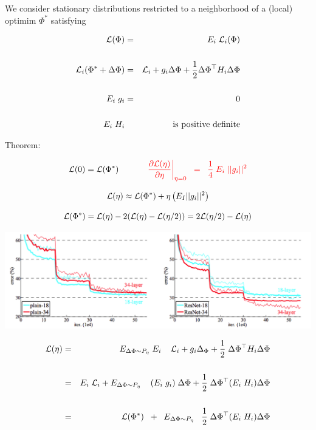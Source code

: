 {\vfill
We consider stationary distributions restricted to a neighborhood of a (local) optimim $\Phi^*$ satisfying

\begin{eqnarray*}
{\cal L}(\Phi) & = & E_i\;{\cal L}_i(\Phi) \\
\\
{\cal L}_i(\Phi^* + \Delta \Phi) & = & {\cal L}_i + g_i \Delta \Phi + \frac{1}{2} \Delta\Phi^\top H_i \Delta\Phi \\
\\
E_i\; g_i & = & 0\\
\\
E_i\; H_i & & \mbox{is positive definite}
\end{eqnarray*}


Theorem:

$${\cal L}(0) = {\cal L}(\Phi^*)\;\;\;\;\;\;\;\;\;\;\;\;{\color{red} \left.\frac{\partial {\cal L}(\eta)}{\partial \eta}\right|_{\eta = 0} \;\;=\;\; \frac{1}{4}\; E_i\; ||g_i||^2}$$


$${\cal L}(\eta) \approx {\cal L}(\Phi^*) + \eta \left(E_I ||g_i||^2\right)$$

\vfill
$${\cal L}(\Phi^*) = {\cal L}(\eta) - 2({\cal L}(\eta) - {\cal L}(\eta/2)) = 2{\cal L}(\eta/2) - {\cal L}(\eta)$$

\vfill
\centerline{\includegraphics[width = 7in]{../images/annealing}}


\begin{eqnarray*}
{\cal L}(\eta) & = & \;\;\; E_{\Delta \Phi \sim P_\eta}\;E_i \;\;\;\; {\cal L}_i + g_i\Delta _\Phi + \frac{1}{2}\;\Delta \Phi^\top H_i \Delta \Phi \\
\\
& = & E_i\; {\cal L}_i + E_{\Delta \Phi \sim P_\eta} \;\;\;\;(E_i\;g_i) \;\Delta \Phi + \frac{1}{2}\;\Delta \Phi^\top (E_i\; H_i) \Delta \Phi \\
\\
& = & {\cal L}(\Phi^*)\;\; + \;\; E_{\Delta \Phi \sim P_\eta}\;\;\;\frac{1}{2}\;\Delta \Phi^\top (E_i\;H_i) \Delta \Phi
\end{eqnarray*}

}
